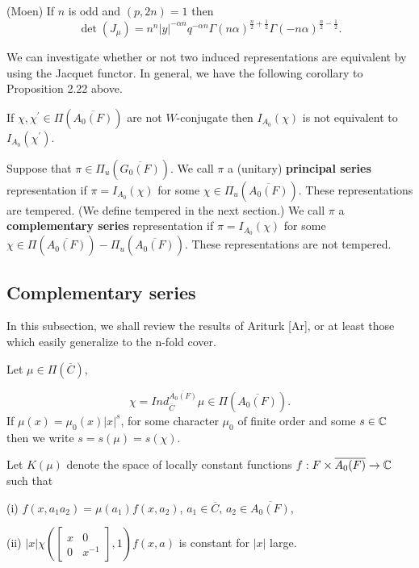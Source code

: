 \begin{proposition}
(Moen) If $n$ is odd and $(p,2n)=1$ then 
\[
\det (J_\mu )=n^n|y|^{-\alpha n}q^{-\alpha n}\Gamma (n\alpha )^{\frac
n2+\frac 12}\Gamma (-n\alpha )^{\frac n2-\frac 12}.
\]
\end{proposition}

We can investigate whether or not two induced representations are equivalent
by using the Jacquet functor. In general, we have the following corollary to
Proposition 2.22 above.

\begin{lemma}
If $\chi ,\chi ^{\prime }\in \Pi (\overline{A_0(F)})$ are not $W$-conjugate
then $I_{A_0}(\chi )$ is not equivalent to $I_{A_0}(\chi ^{\prime })$.
\end{lemma}

Suppose that $\pi \in \Pi _u(\overline{G_0(F)})$. We call $\pi $ a (unitary) 
{\bf principal series} representation if $\pi =I_{A_0}(\chi )$ for some
$\chi \in \Pi _u(\overline{A_0(F)})$. These representations are tempered. (We
define tempered in the next section.) We call $\pi $ a {\bf complementary
  series} representation if $\pi =I_{A_0}(\chi )$ for some
$\chi \in \Pi (\overline{A_0(F)})-\Pi _u(\overline{A_0(F)})$.
These representations are not
tempered.

\subsection{Complementary series}

In this subsection, we shall review the results of Ariturk [Ar], or at least
those which easily generalize to the n-fold cover.

Let $\mu \in \Pi (\overline{C})$,

\[
\chi =Ind_{\overline{C}}^{\overline{A_0(F)}}\mu \in \Pi (\overline{A_0(F)}).
\]
If $\mu (x)=\mu _0(x)|x|^s$, for some
character $\mu _0$ of finite order and some $s\in {\Bbb C}$ then we write
$s=s(\mu )=s(\chi )$.

Let $K(\mu )$ denote the space of locally constant functions $f:F\times 
\overline{A_0(F)}\rightarrow {\Bbb C}$ such that

(i) $f(x,a_1a_2)=\mu (a_1)f(x,a_2)$, $a_1\in \overline{C}$, $a_2\in 
\overline{A_0(F)}$,

(ii) $|x|\chi (\left[ 
\begin{array}{cc}
x & 0 \\ 
0 & x^{-1}
\end{array}
\right] ,1)f(x,a)$ is constant for $|x|$ large.

